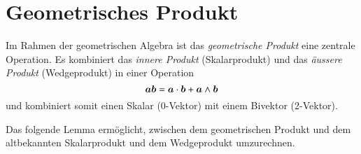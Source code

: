 \section{Geometrisches Produkt}
%
Im Rahmen der geometrischen Algebra ist das \emph{geometrische Produkt} eine zentrale Operation. 
%
%
Es kombiniert das \emph{innere Produkt} (Skalarprodukt) und das
%
%
\emph{äussere Produkt} (Wedgeprodukt) in einer Operation
%
%
\begin{equation*}
\a \b = \a \cdot \b + \a \wedge \b
\end{equation*}
und kombiniert somit einen Skalar (0-Vektor) mit einem Bivektor (2-Vektor).

Das folgende Lemma ermöglicht, zwischen dem geometrischen Produkt und dem altbekannten
Skalarprodukt und dem Wedgeprodukt umzurechnen.

